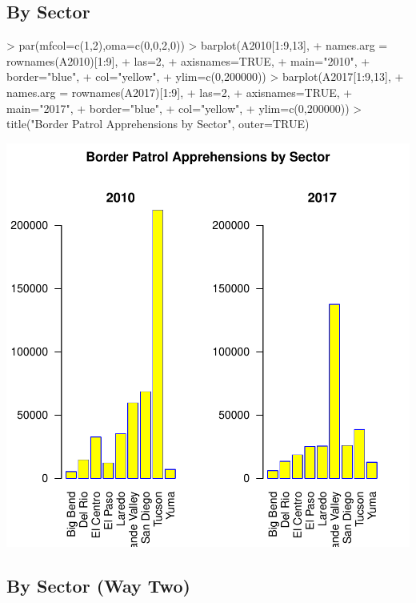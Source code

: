 \documentclass[letterpaper]{article}
\begin{document}
\subsection{By Sector}
\begin{Schunk}
\begin{Sinput}
> par(mfcol=c(1,2),oma=c(0,0,2,0))
> barplot(A2010[1:9,13], 
+         names.arg = rownames(A2010)[1:9], 
+         las=2,
+         axisnames=TRUE,
+         main="2010",
+         border="blue",
+         col="yellow",
+         ylim=c(0,200000))
> barplot(A2017[1:9,13], 
+         names.arg = rownames(A2017)[1:9], 
+         las=2,
+         axisnames=TRUE,
+         main="2017",
+         border="blue",
+         col="yellow",
+         ylim=c(0,200000))
> title("Border Patrol Apprehensions by Sector", outer=TRUE)
\end{Sinput}
\end{Schunk}
\includegraphics{Document-003}

\subsection{By Sector (Way Two)}
\end{document}
